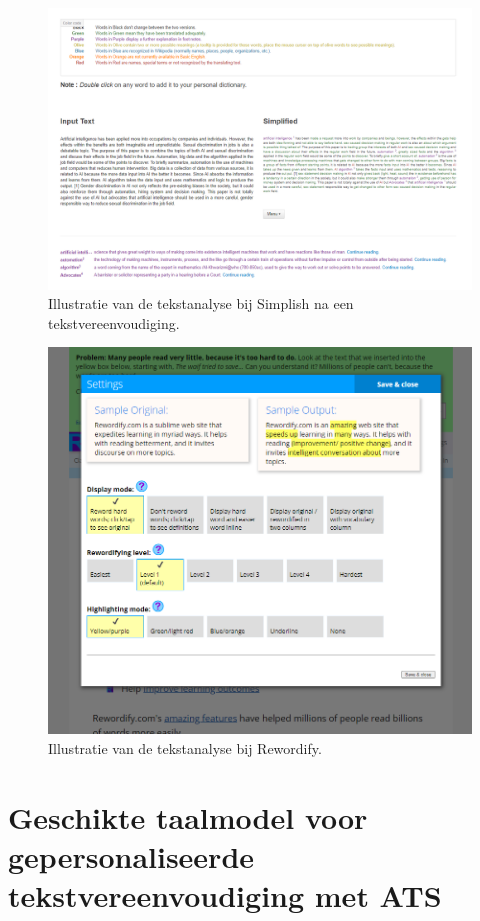 \begin{figure}[H]
	\includegraphics[width=\linewidth]{img/simplish-output.png}
	\caption{Illustratie van de tekstanalyse bij Simplish na een tekstvereenvoudiging.}
	\label{img:simplish-output}
\end{figure}

\begin{figure}[H]
	\includegraphics[width=\linewidth]{img/scholarcy-attempt.png}
	\caption{Illustratie van de tekstanalyse bij Rewordify.}
	\label{img:scholarcy}
\end{figure}

\section{Geschikte taalmodel voor gepersonaliseerde tekstvereenvoudiging met ATS}



